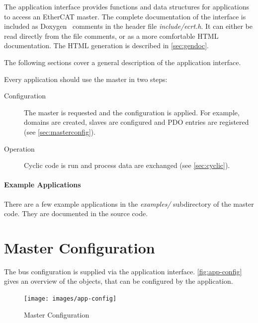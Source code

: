 \documentclass[a4paper,12pt,BCOR6mm,bibtotoc,idxtotoc]{scrbook}
\begin{document}
%

The application interface provides functions and data structures for
applications to access an EtherCAT master. The complete documentation of the
interface is included as Doxygen~\cite{doxygen} comments in the header file
\textit{include/ecrt.h}. It can either be read directly from the file
comments, or as a more comfortable HTML documentation. The HTML generation is
described in \autoref{sec:gendoc}.

The following sections cover a general description of the application
interface.

Every application should use the master in two steps:

\begin{description}

\item[Configuration] The master is requested and the configuration is applied.
For example, domains are created, slaves are configured and PDO entries are
registered (see \autoref{sec:masterconfig}).

\item[Operation] Cyclic code is run and process data are exchanged (see
\autoref{sec:cyclic}).

\end{description}

\paragraph{Example Applications} There are a few
example applications in the \textit{examples/} subdirectory of the master
code. They are documented in the source code.


\section{Master Configuration}
\label{sec:masterconfig}

The bus configuration is supplied via the application interface.
\autoref{fig:app-config} gives an overview of the objects, that can be
configured by the application.

\begin{figure}[htbp]
  \centering
  \texttt{[image: images/app-config]}
  \caption{Master Configuration}
  \label{fig:app-config}
\end{figure}
\end{document}
